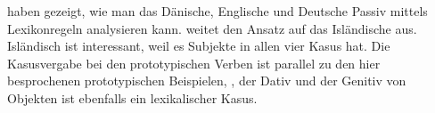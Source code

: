 {{\citet{MOe2013a} haben gezeigt, wie man das Dänische, Englische und Deutsche Passiv mittels
Lexikonregeln analysieren kann. \citet{MuellerGermanic} weitet den Ansatz auf das Isländische
aus. Isländisch ist interessant, weil es Subjekte in allen vier Kasus hat. Die Kasusvergabe bei den
prototypischen Verben ist parallel zu den hier besprochenen prototypischen Beispielen, \dash, der
Dativ und der Genitiv von Objekten ist ebenfalls ein lexikalischer Kasus.
}



}
